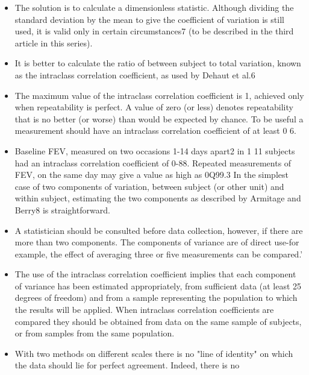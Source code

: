 \documentclass{article}
\begin{document}
\begin{itemize}
\item The solution
is to calculate a dimensionless statistic.
Although dividing the standard deviation by
the mean to give the coefficient of variation is
still used, it is valid only in certain circumstances7
(to be described in the third article in
this series). 

\item  It is better to calculate the ratio of
between subject to total variation, known as the intraclass correlation coefficient, as used by
Dehaut et al.6 

\item The maximum value of the
intraclass correlation coefficient is 1, achieved
only when repeatability is perfect. A value of zero (or less) denotes repeatability that is no
better (or worse) than would be expected by chance. To be useful a measurement should
have an intraclass correlation coefficient of at least 0 6. 
\item Baseline FEV, measured on two
occasions 1-14 days apart2 in 1 11 subjects had
an intraclass correlation coefficient of 0-88.
Repeated measurements of FEV, on the same day may give a value as high as 0Q99.3 In the
simplest case of two components of variation,
between subject (or other unit) and within subject, estimating the two components as
described by Armitage and Berry8 is straightforward.

\item A statistician should be consulted
before data collection, however, if there are more than two components. The components
of variance are of direct use-for example, the effect of averaging three or five measurements
can be compared.'

\item The use of the intraclass correlation coefficient
implies that each component of
variance has been estimated appropriately, from sufficient data (at least 25 degrees of
freedom) and from a sample representing the population to which the results will be applied.
When intraclass correlation coefficients are compared they should be obtained from data on
the same sample of subjects, or from samples from the same population.
\item With two methods on different scales there is no "line of identity" on which the data should
lie for perfect agreement. Indeed, there is no
\end{itemize}
\end{document}
